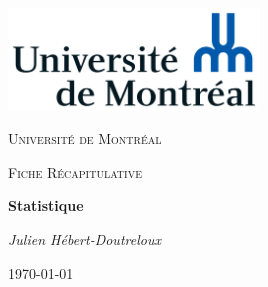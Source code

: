 \documentclass{article}[babel]
\begin{document}
		\begin{titlepage}
		\centering
		\includegraphics[width=0.5\textwidth]{Universite_de_Montreal_logo}\par\vspace{1cm}
		{\scshape\LARGE Université de Montréal\par}
		\vspace{1cm}
		{\scshape\Large Fiche Récapitulative\par}
		\vspace{1.5cm}
		{\huge\bfseries Statistique\par}
		\vspace{2cm}
		{\Large\itshape Julien Hébert-Doutreloux\par}
		\vfill
		\vfill
		{\large \today\par}
	\end{titlepage}
	\setcounter{page}{2}
	\tableofcontents
	\pagebreak
	
		\pagebreak
	
		\pagebreak
	
		\pagebreak
	
		\pagebreak
	
		\pagebreak
	
		\pagebreak
	
	\newpage
	\printindex
\end{document}
